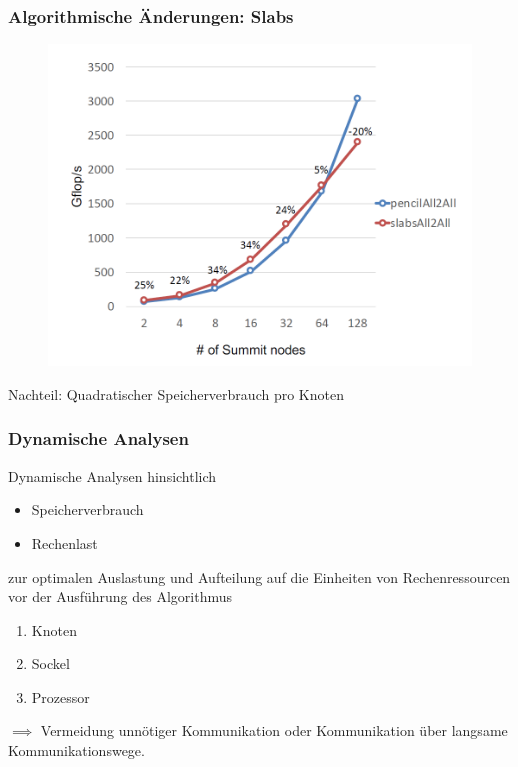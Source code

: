 \frame
{
	\frametitle{Algorithmische Änderungen: Slabs}
	\begin{figure}[h!]
		\centering
		\includegraphics[width=0.7\linewidth, keepaspectratio]{../res/bench2.png}
		\footnotemark[1]
	\end{figure}
	Nachteil: Quadratischer Speicherverbrauch pro Knoten
	
}
\frame
{
	\frametitle{Dynamische Analysen}
	Dynamische Analysen hinsichtlich
	\begin{itemize}
		\item Speicherverbrauch
		\item Rechenlast
	\end{itemize}
	zur optimalen Auslastung und Aufteilung auf die Einheiten von Rechenressourcen vor der Ausführung des Algorithmus
	\begin{enumerate}
		\item{Knoten}
		\item{Sockel}
		\item{Prozessor}
	\end{enumerate}
	$\implies$ Vermeidung unnötiger Kommunikation oder Kommunikation über langsame Kommunikationswege.
}
